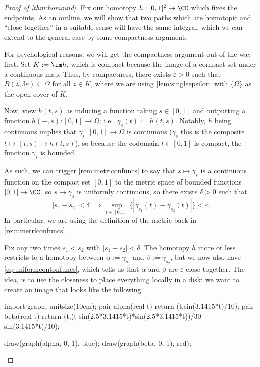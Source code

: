 \begin{proof}[Proof of \autoref{thm:homoind}]
	Fix our homotopy $h:[0,1]^2\to\CC$ which fixes the endpoints. As an outline, we will show that two paths which are homotopic and ``close together'' in a suitable sense will have the same integral, which we can extend to the general case by some compactness argument.
	
	For psychological reasons, we will get the compactness argument out of the way first. Set $K:=\im h$, which is compact because the image of a compact set under a continuous map. Thus, by compactness, there exists $\varepsilon>0$ such that $B(z,3\varepsilon)\subseteq\Omega$ for all $z\in K$, where we are using \autoref{lem:singleepsilon} with $\{\Omega\}$ as the open cover of $K$.

	Now, view $h(t,s)$ as inducing a function taking $s\in[0,1]$ and outputting a function $h(-,s):[0,1]\to\Omega$; i.e., $\gamma_s(t):=h(t,s)$. Notably, $h$ being continuous implies that $\gamma_s:[0,1]\to\Omega$ is continuous ($\gamma_s$ this is the composite $t\mapsto(t,s)\mapsto h(t,s)$), so because the codomain $t\in[0,1]$ is compact, the function $\gamma_s$ is bounded.
	
	As such, we can trigger \autoref{rem:metriconfuncs} to say that $s\mapsto\gamma_s$ is a continuous function on the compact set $[0,1]$ to the metric space of bounded functions $[0,1]\to\CC$, so $s\mapsto\gamma_s$ is uniformly continuous, so there exists $\delta>0$ such that
	\[|s_1-s_2|<\delta\implies\sup_{t\in[0,1]}\{|\gamma_{s_1}(t)-\gamma_{s_2}(t)|\}<\varepsilon.\tag{$*$}\label{eq:uniformcontonfuncs}\]
	In particular, we are using the definition of the metric back in \autoref{rem:metriconfuncs}.

	Fix any two times $s_1<s_2$ with $|s_1-s_2|<\delta$. The homotopy $h$ more or less restricts to a homotopy between $\alpha:=\gamma_{s_1}$ and $\beta:=\gamma_{s_2}$, but we now also have \autoref{eq:uniformcontonfuncs}, which tells us that $\alpha$ and $\beta$ are $\varepsilon$-close together. The idea, is to use the closeness to place everything locally in a disk: we want to create an image that looks like the following.
	\begin{center}
		\begin{asy}
			import graph;
			unitsize(10cm);
			pair alpha(real t)
			{
				return (t,sin(3.1415*t)/10);
			}
			pair beta(real t)
			{
				return (t,(t-sin(2.5*3.1415*t)*sin(2.5*3.1415*t))/30 - sin(3.1415*t)/10);
			}
	
			draw(graph(alpha, 0, 1), blue);
			draw(graph(beta, 0, 1), red);
	

\end{asy}
\end{center}
\end{proof}
